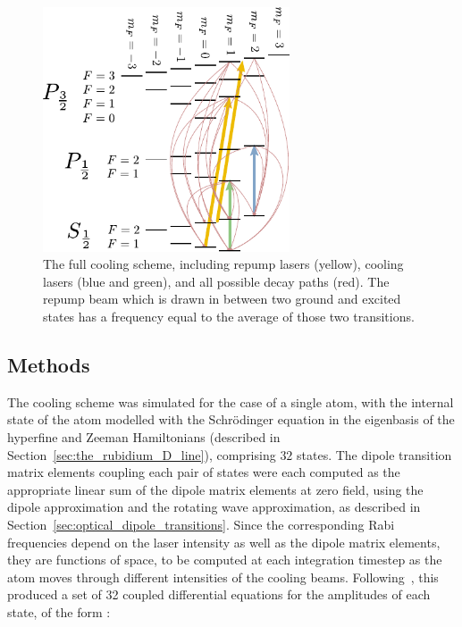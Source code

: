 \begin{figure}
\begin{center}
\includegraphics[width=0.65\textwidth]{figures/unsorted/cooling_full.pdf}
\caption{The full cooling scheme, including repump lasers (yellow), cooling lasers (blue and green), and all possible decay paths (red). The repump beam which is drawn in between two ground and excited states has a frequency equal to the average of those two transitions.}\label{fig:cooling_full}
\end{center}
\end{figure}

\subsection{Methods}

The cooling scheme was simulated for the case of a single atom, with the internal state of the atom modelled with the Schr\"odinger equation in the eigenbasis of the hyperfine and Zeeman Hamiltonians (described in Section~\ref{sec:the_rubidium_D_line}), comprising $32$ states. The dipole transition matrix elements coupling each pair of states were each computed as the appropriate linear sum of the dipole matrix elements at zero field, using the dipole approximation and the rotating wave approximation, as described in Section~\ref{sec:optical_dipole_transitions}. Since the corresponding Rabi frequencies depend on the laser intensity as well as the dipole matrix elements, they are functions of space, to be computed at each integration timestep as the atom moves through different intensities of the cooling beams. Following~\cite[p 4]{metcalf_laser_1999}, this produced a set of 32 coupled differential equations for the amplitudes of each state, of the form :

